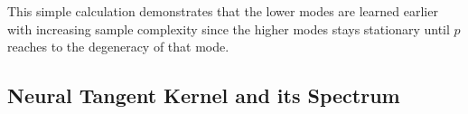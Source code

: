 \documentclass{article}
\begin{document}

This simple calculation demonstrates that the lower modes are learned earlier with increasing sample complexity since the higher modes stays stationary until $p$ reaches to the degeneracy of that mode.






\subsection{Neural Tangent Kernel and its Spectrum}
\end{document}
